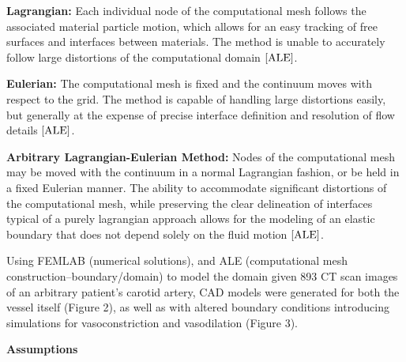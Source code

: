 \documentclass[12pt, a4paper]{article}
\theoremstyle{plain}
\theoremstyle{definition}
\theoremstyle{remark}
\begin{document}
\textbf{Lagrangian:}
Each individual node of the computational mesh follows the associated material particle motion, which allows for an easy tracking of free surfaces and interfaces between materials. The method is unable to accurately follow large distortions of the computational domain $\cite{ALE}$. 

\textbf{Eulerian:}
The computational mesh is fixed and the continuum moves with respect to the grid. The method is capable of handling large distortions easily, but generally at the expense of precise interface definition and resolution of flow details $\cite{ALE}$.

\textbf{Arbitrary Lagrangian-Eulerian Method:}
Nodes of the computational mesh may be moved with the continuum in a normal Lagrangian fashion, or be held in a fixed Eulerian manner. The ability to accommodate significant distortions of the computational mesh, while preserving the clear delineation of interfaces typical of a purely lagrangian approach allows for the modeling of an elastic boundary that does not depend solely on the fluid motion $\cite{ALE}$.

Using FEMLAB (numerical solutions), and ALE (computational mesh construction--boundary/domain) to model the domain given 893 CT scan images of an arbitrary patient's carotid artery, CAD models were generated for both the vessel itself (Figure 2), as well as with altered boundary conditions introducing simulations for vasoconstriction and vasodilation (Figure 3). 

\textbf{Assumptions}
\end{document}
